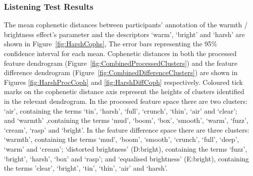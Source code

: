 		\subsubsection{Listening Test Results}
			The mean cophenetic distances between participants' annotation of the warmth / brightness effect's
			parameter and the descriptors `warm', `bright' and `harsh' are shown in
			Figure~\ref{fig:HarshCophs}, The error bars representing the 95\% confidence interval for each
			mean.  Cophenetic distances in both the processed feature dendrogram
			(Figure~\ref{fig:CombinedProcessedClusters}) and the feature difference dendrogram
			(Figure~\ref{fig:CombinedDifferenceClusters}) are shown in Figures \ref{fig:HarshProcCoph} and
			\ref{fig:HarshDiffCoph} respectively. Coloured tick marks on the cophenetic distance axis represent
			the heights of clusters identified in the relevant dendrogram. In the processed feature space there
			are two clusters: `air', containing the terms `tin', `harsh', `full', `crunch', `thin', `air' and
			`clear'; and `warmth' ,containing the terms `mud', `boom', `box', `smooth', `warm', `fuzz',
			`cream', `rasp' and `bright'. In the feature difference space there are three clusters: `warmth',
			containing the terms `mud', `boom', `smooth', `crunch', `full', `deep', `warm' and `cream';
			`distorted brightness' (D:bright), containing the terms `fuzz', `bright', `harsh', `box' and
			`rasp'; and `equalised brightness' (E:bright), containing the terms 'clear', `bright', `tin',
			`thin', `air' and `harsh'.

